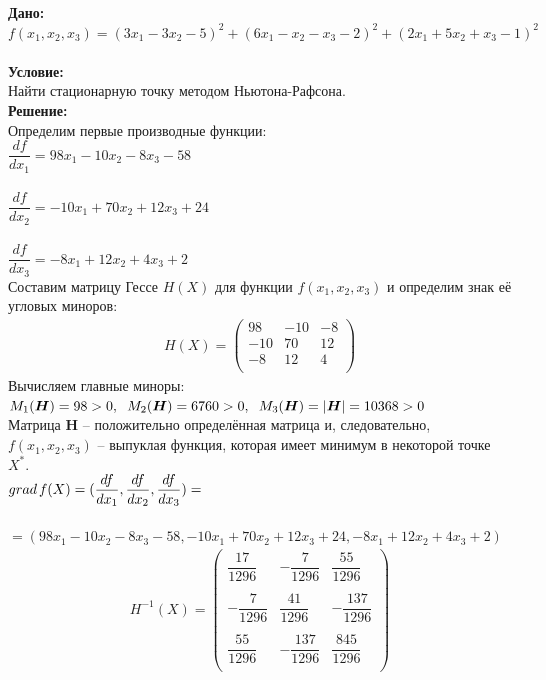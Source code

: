 \documentclass[14pt,a4paper,fleqn]{extarticle}
\begin{document}
	\textbf{Дано:}\\
	$f(x_1,x_2,x_3) = (3x_1-3x_2-5)^2 + (6x_1-x_2-x_3-2)^2+(2x_1+5x_2+x_3-1)^2$\\\\
	\textbf{Условие:}\\
	Найти стационарную точку методом Ньютона-Рафсона.\\
	
	\textbf{Решение:}\\
	Определим первые производные функции:\\
	
	$\dfrac{df}{dx_1} = 98x_1 - 10x_2 - 8x_3 - 58$\\\\
	$\dfrac{df}{dx_2} = -10x_1 + 70x_2 + 12x_3 + 24$\\\\
	$\dfrac{df}{dx_3} = -8x_1 + 12x_2 + 4x_3 + 2$\\
	
	Составим матрицу Гессе $H(X)$ для функции $f(x_1,x_2,x_3)$ и определим знак её угловых миноров:
	\begin{align*}
		H(X) = \begin{pmatrix}
			98 & -10 & -8\\
			-10 & 70 & 12\\
			-8 & 12 & 4\\
		\end{pmatrix}
	\end{align*}
	Вычисляем главные миноры:\\
	$M_1(\boldsymbol{H}) = 98 > 0, \hspace*{0.2cm} M_2(\boldsymbol{H}) = 6760 > 0, \hspace*{0.2cm} M_3(\boldsymbol{H}) = |\boldsymbol{H}| = 10368 > 0$\\
	
	Матрица \textbf{H} -- положительно определённая матрица и, следовательно, $f(x_1, x_2, x_3)$ -- выпуклая функция, которая имеет минимум в некоторой точке $X^*$.\\
	
	$grad\hspace*{0.05cm}f(X) = (\dfrac{df}{dx_1}, \dfrac{df}{dx_2}, \dfrac{df}{dx_3}) =$\\\\
	$= (98x_1 - 10x_2 - 8x_3 - 58, -10x_1 + 70x_2 + 12x_3 + 24, -8x_1 + 12x_2 + 4x_3 + 2)$\\
	\newpage
	\begin{align*}
		H^{-1}(X) = \begin{pmatrix}
			\dfrac{17}{1296} & -\dfrac{7}{1296} & \dfrac{55}{1296}\\\\
			-\dfrac{7}{1296} & \dfrac{41}{1296} & -\dfrac{137}{1296}\\\\
			\dfrac{55}{1296} & -\dfrac{137}{1296} & \dfrac{845}{1296}\\
		\end{pmatrix}
	\end{align*}
\end{document}
